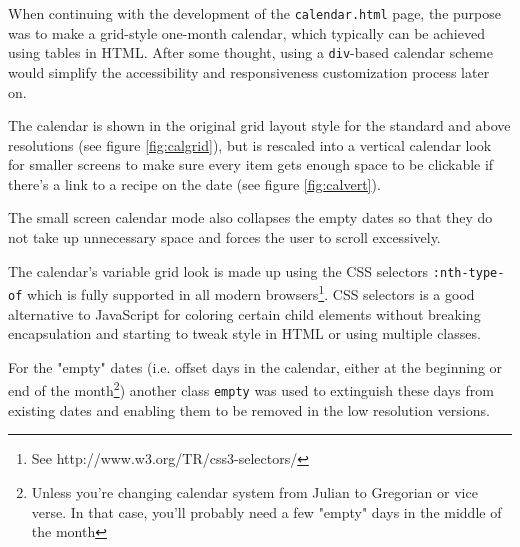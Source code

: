 \documentclass[a4paper]{scrartcl}
\begin{document}
When continuing with the development of the \texttt{calendar.html} page, the purpose was to make a grid-style one-month calendar, which typically can be achieved using tables in HTML. After some thought, using a \texttt{div}-based calendar scheme would simplify the accessibility and responsiveness customization process later on.

The calendar is shown in the original grid layout style for the standard and above resolutions (see figure \ref{fig:calgrid}), but is rescaled into a vertical calendar look for smaller screens to make sure every item gets enough space to be clickable if there's a link to a recipe on the date (see figure \ref{fig:calvert}).

The small screen calendar mode also collapses the empty dates so that they do not take up unnecessary space and forces the user to scroll excessively.

The calendar's variable grid look is made up using the CSS selectors \texttt{:nth-type-of} which is fully supported in all modern browsers\footnote{See http://www.w3.org/TR/css3-selectors/}. CSS selectors is a good alternative to JavaScript for coloring certain child elements without breaking encapsulation and starting to tweak style in HTML or using multiple classes.

For the "empty" dates (i.e. offset days in the calendar, either at the beginning or end of the month\footnote{Unless you're changing calendar system from Julian to Gregorian or vice verse. In that case, you'll probably need a few "empty" days in the middle of the month}) another class \texttt{empty} was used to extinguish these days from existing dates and enabling them to be removed in the low resolution versions.
\end{document}
